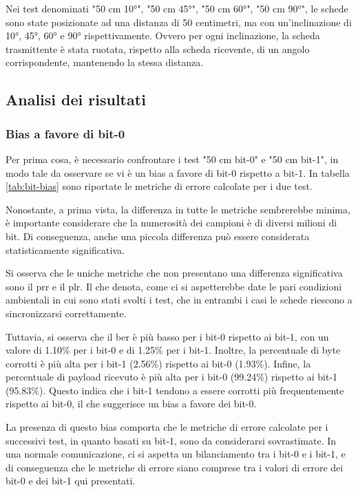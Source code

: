 Nei test denominati "50 cm 10°", "50 cm 45°", "50 cm 60°", "50 cm 90°", le schede sono state posizionate ad una distanza di 50 centimetri, ma con un'inclinazione di 10°, 45°, 60° e 90° rispettivamente. Ovvero per ogni inclinazione, la scheda trasmittente è stata ruotata, rispetto alla scheda ricevente, di un angolo corrispondente, mantenendo la stessa distanza.

\subsection{Analisi dei risultati}
\subsubsection{Bias a favore di bit-0}
Per prima cosa, è necessario confrontare i test "50 cm bit-0" e "50 cm bit-1", in modo tale da osservare se vi è un bias a favore di bit-0 rispetto a bit-1. In tabella \ref{tab:bit-bias} sono riportate le metriche di errore calcolate per i due test.

Nonostante, a prima vista, la differenza in tutte le metriche sembrerebbe minima, è importante considerare che la numerosità dei campioni è di diversi milioni di bit. Di conseguenza, anche una piccola differenza può essere considerata statisticamente significativa.

Si osserva che le uniche metriche che non presentano una differenza significativa sono il \gls{prr} e il \gls{plr}. Il che denota, come ci si aspetterebbe date le pari condizioni ambientali in cui sono stati svolti i test, che in entrambi i casi le schede riescono a sincronizzarsi correttamente.

Tuttavia, si osserva che il \gls{ber} è più basso per i bit-0 rispetto ai bit-1, con un valore di 1.10\% per i bit-0 e di 1.25\% per i bit-1. Inoltre, la percentuale di byte corrotti è più alta per i bit-1 (2.56\%) rispetto ai bit-0 (1.93\%). Infine, la percentuale di payload ricevuto è più alta per i bit-0 (99.24\%) rispetto ai bit-1 (95.83\%). Questo indica che i bit-1 tendono a essere corrotti più frequentemente rispetto ai bit-0, il che suggerisce un bias a favore dei bit-0.

La presenza di questo bias comporta che le metriche di errore calcolate per i successivi test, in quanto basati su bit-1, sono da considerarsi sovrastimate. In una normale comunicazione, ci si aspetta un bilanciamento tra i bit-0 e i bit-1, e di conseguenza che le metriche di errore siano comprese tra i valori di errore dei bit-0 e dei bit-1 qui presentati.


